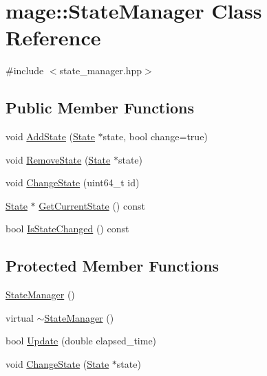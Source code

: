 \hypertarget{classmage_1_1_state_manager}{}\section{mage\+:\+:State\+Manager Class Reference}
\label{classmage_1_1_state_manager}


{\ttfamily \#include $<$state\+\_\+manager.\+hpp$>$}

\subsection*{Public Member Functions}
\begin{DoxyCompactItemize}
\item 
void \hyperlink{classmage_1_1_state_manager_ae5711ea7782384bc52b09a14cf1f3f5d}{Add\+State} (\hyperlink{classmage_1_1_state}{State} $\ast$state, bool change=true)
\item 
void \hyperlink{classmage_1_1_state_manager_ad1589f7792508f0568f673b925a2bdba}{Remove\+State} (\hyperlink{classmage_1_1_state}{State} $\ast$state)
\item 
void \hyperlink{classmage_1_1_state_manager_a2dfcae20e58167786a2772f204951657}{Change\+State} (uint64\+\_\+t id)
\item 
\hyperlink{classmage_1_1_state}{State} $\ast$ \hyperlink{classmage_1_1_state_manager_ab3a37b1ef0d2e9960ff4c98747c64d3f}{Get\+Current\+State} () const
\item 
bool \hyperlink{classmage_1_1_state_manager_abd9c136e1a0f7e375450be5e50e2fc64}{Is\+State\+Changed} () const
\end{DoxyCompactItemize}
\subsection*{Protected Member Functions}
\begin{DoxyCompactItemize}
\item 
\hyperlink{classmage_1_1_state_manager_a6c4504d0b50fe671299b080f3be30c8e}{State\+Manager} ()
\item 
virtual \hyperlink{classmage_1_1_state_manager_af4bc45cc90437f54e2776e2a8ee747e1}{$\sim$\+State\+Manager} ()
\item 
bool \hyperlink{classmage_1_1_state_manager_a48498596d478d107621b1752104e02e3}{Update} (double elapsed\+\_\+time)
\item 
void \hyperlink{classmage_1_1_state_manager_aef491583e2e15f59aec1b98be1406fe5}{Change\+State} (\hyperlink{classmage_1_1_state}{State} $\ast$state)
\end{DoxyCompactItemize}
